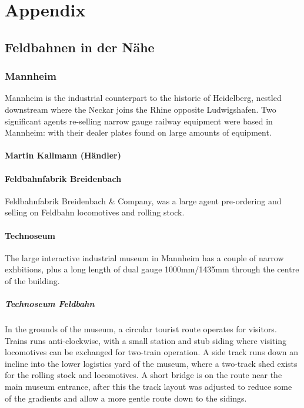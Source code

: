 \documentclass[a4paper]{report}
\begin{document}
\part{Appendix}

\chapter{Feldbahnen in der Nähe}

\section{Mannheim}

Mannheim is the industrial counterpart to the historic of Heidelberg,
nestled downstream where the Neckar joins the Rhine opposite
Ludwigshafen.  Two significant agents re-selling narrow gauge railway
equipment were based in Mannheim: with their dealer plates found on
large amounts of equipment.

\subsection{Martin Kallmann (Händler)}

\subsection{Feldbahnfabrik Breidenbach}

Feldbahnfabrik Breidenbach \& Company, was a large agent pre-ordering
and selling on Feldbahn locomotives and rolling stock.

\subsection{Technoseum}

The large interactive industrial museum in Mannheim has a couple of
narrow exhbitions, plus a long length of dual gauge 1000mm/1435mm through the centre of the building.

\subsubsection{Technoseum Feldbahn}

In the grounds of the museum, a circular tourist route operates for
visitors.  Trains runs anti-clockwise, with a small station and stub
siding where visiting locomotives can be exchanged for two-train
operation.  A side track runs down an incline into the lower logistics
yard of the museum, where a two-track shed exists for the rolling
stock and locomotives.  A short bridge is on the route near the main
museum entrance, after this the track layout was adjusted to reduce
some of the gradients and allow a more gentle route down to the
sidings.
\end{document}
